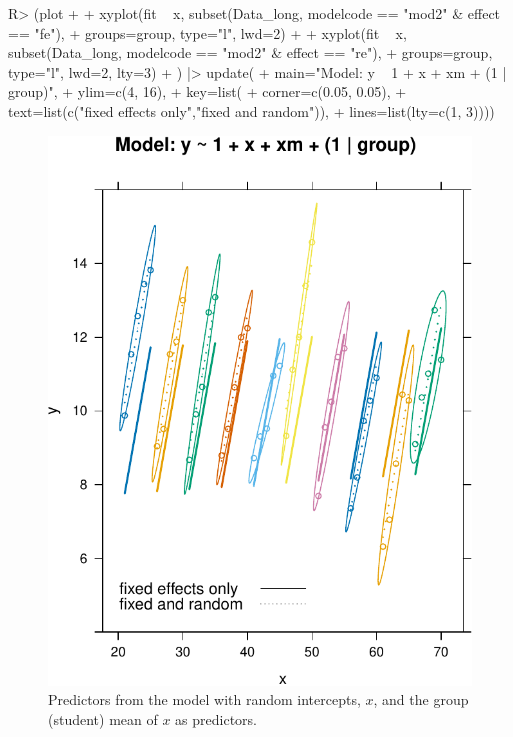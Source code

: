 \documentclass[
]{jss}
\begin{document}
\begin{CodeChunk}
\begin{CodeInput}
R> (plot +
+   xyplot(fit ~ x, subset(Data_long, modelcode == "mod2" & effect == "fe"),
+          groups=group, type="l", lwd=2) +
+   xyplot(fit ~ x, subset(Data_long, modelcode == "mod2" & effect == "re"),
+          groups=group, type="l", lwd=2, lty=3)
+ ) |> update(
+   main="Model: y ~ 1 + x + xm + (1 | group)",
+   ylim=c(4, 16),
+   key=list(
+     corner=c(0.05, 0.05),
+     text=list(c("fixed effects only","fixed and random")),
+     lines=list(lty=c(1, 3))))
\end{CodeInput}
\begin{figure}

{\centering \includegraphics[width=1\linewidth]{JSS-article_files/figure-latex/plot-fits-mod2-1} 

}

\caption[Predictors from the model with random intercepts, $x$, and the group (student) mean of $x$ as predictors]{Predictors from the model with random intercepts, $x$, and the group (student) mean of $x$ as predictors.}\label{fig:plot-fits-mod2}
\end{figure}
\end{CodeChunk}
\end{document}

